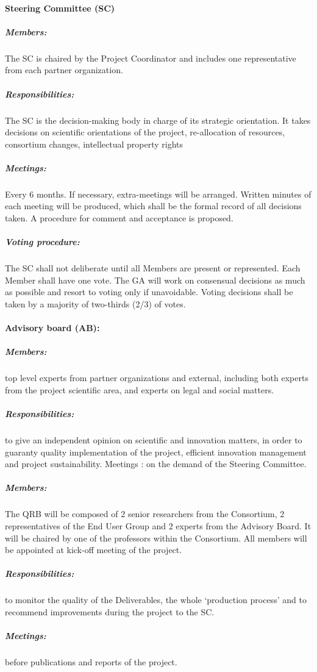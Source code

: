 \paragraph{Steering Committee (SC)}

\subparagraph{Members:} The SC is chaired by the Project Coordinator
and includes one representative from each partner organization.

\subparagraph{Responsibilities:} The SC is the decision-making body in
charge of its strategic orientation.  It takes decisions on scientific
orientations of the project, re-allocation of resources, consortium
changes, intellectual property rights

\subparagraph{Meetings:} Every 6 months. If necessary, extra-meetings
will be arranged.  Written minutes of each meeting will be produced,
which shall be the formal record of all decisions taken. A procedure
for comment and acceptance is proposed.

\subparagraph{Voting procedure:} The SC shall not deliberate until all
Members are present or represented.  Each Member shall have one
vote. The GA will work on consensual decisions as much as possible and
resort to voting only if unavoidable. Voting decisions shall be taken
by a majority of two-thirds (2/3) of votes.

\paragraph{Advisory board (AB):}

\subparagraph{Members:} top level experts from partner organizations
and external, including both experts from the project scientific area,
and experts on legal and social matters.

\subparagraph{Responsibilities:} to give an independent opinion on
scientific and innovation matters, in order to guaranty quality
implementation of the project, efficient innovation management and
project sustainability.  Meetings : on the demand of the Steering
Committee.

\subparagraph{Members:} The QRB will be composed of 2 senior
researchers from the Consortium, 2 representatives of the End User
Group and 2 experts from the Advisory Board. It will be chaired by one
of the professors within the Consortium. All members will be appointed
at kick-off meeting of the project.  
\subparagraph{Responsibilities:}
to monitor the quality of the Deliverables, the whole ‘production
process’ and to recommend improvements during the project to the SC.
\subparagraph{Meetings:} before publications and reports of the
project.

